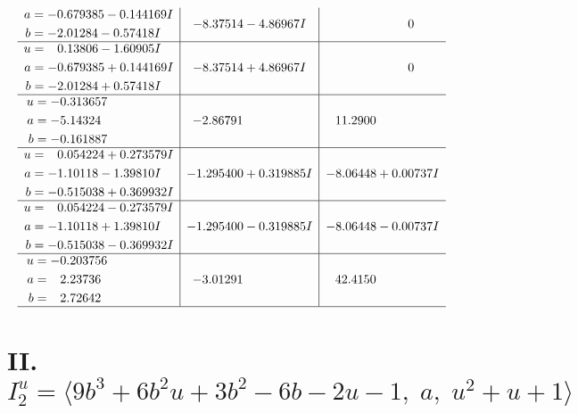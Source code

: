 \documentclass[1p]{elsarticle_modified}
\theoremstyle{definition}
\begin{document}
$$\begin{array}{c|c|c}
\begin{aligned}
a &= -0.679385 - 0.144169 I \\
b &= -2.01284 - 0.57418 I\end{aligned}
 & -8.37514 - 4.86967 I & \phantom{-0.000000 } 0 \\ \hline\begin{aligned}
u &= \phantom{-}0.13806 - 1.60905 I \\
a &= -0.679385 + 0.144169 I \\
b &= -2.01284 + 0.57418 I\end{aligned}
 & -8.37514 + 4.86967 I & \phantom{-0.000000 } 0 \\ \hline\begin{aligned}
u &= -0.313657\phantom{ +0.000000I} \\
a &= -5.14324\phantom{ +0.000000I} \\
b &= -0.161887\phantom{ +0.000000I}\end{aligned}
 & -2.86791\phantom{ +0.000000I} & \phantom{-}11.2900\phantom{ +0.000000I} \\ \hline\begin{aligned}
u &= \phantom{-}0.054224 + 0.273579 I \\
a &= -1.10118 - 1.39810 I \\
b &= -0.515038 + 0.369932 I\end{aligned}
 & -1.295400 + 0.319885 I & -8.06448 + 0.00737 I \\ \hline\begin{aligned}
u &= \phantom{-}0.054224 - 0.273579 I \\
a &= -1.10118 + 1.39810 I \\
b &= -0.515038 - 0.369932 I\end{aligned}
 & -1.295400 - 0.319885 I & -8.06448 - 0.00737 I \\ \hline\begin{aligned}
u &= -0.203756\phantom{ +0.000000I} \\
a &= \phantom{-}2.23736\phantom{ +0.000000I} \\
b &= \phantom{-}2.72642\phantom{ +0.000000I}\end{aligned}
 & -3.01291\phantom{ +0.000000I} & \phantom{-}42.4150\phantom{ +0.000000I}\\
 \hline 
 \end{array}$$\newpage\newpage\renewcommand{\arraystretch}{1}
\centering \section*{II. $I^u_{2}= \langle 9 b^3+6 b^2 u+3 b^2-6 b-2 u-1,\;a,\;u^2+u+1 \rangle$}
\end{document}
